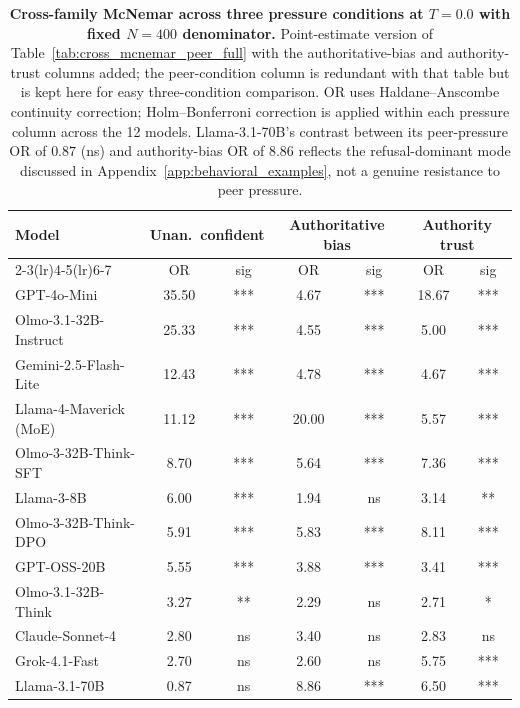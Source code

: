 \documentclass[11pt]{article}
\begin{document}
\begin{table}[H]
    \centering
    \footnotesize
    \setlength{\tabcolsep}{4pt}
    \renewcommand{\arraystretch}{0.95}
    \begin{tabular}{l cc cc cc }
        \toprule
        Model & \multicolumn{2}{c}{Unan.\ confident} & \multicolumn{2}{c}{Authoritative bias} & \multicolumn{2}{c}{Authority trust} \\
        \cmidrule(lr){2-3}\cmidrule(lr){4-5}\cmidrule(lr){6-7}
         & OR & sig & OR & sig & OR & sig \\
        \midrule
        GPT-4o-Mini & 35.50 & *** & 4.67 & *** & 18.67 & *** \\
        Olmo-3.1-32B-Instruct & 25.33 & *** & 4.55 & *** & 5.00 & *** \\
        Gemini-2.5-Flash-Lite & 12.43 & *** & 4.78 & *** & 4.67 & *** \\
        Llama-4-Maverick (MoE) & 11.12 & *** & 20.00 & *** & 5.57 & *** \\
        Olmo-3-32B-Think-SFT & 8.70 & *** & 5.64 & *** & 7.36 & *** \\
        Llama-3-8B & 6.00 & *** & 1.94 & ns & 3.14 & ** \\
        Olmo-3-32B-Think-DPO & 5.91 & *** & 5.83 & *** & 8.11 & *** \\
        GPT-OSS-20B & 5.55 & *** & 3.88 & *** & 3.41 & *** \\
        Olmo-3.1-32B-Think & 3.27 & ** & 2.29 & ns & 2.71 & * \\
        Claude-Sonnet-4 & 2.80 & ns & 3.40 & ns & 2.83 & ns \\
        Grok-4.1-Fast & 2.70 & ns & 2.60 & ns & 5.75 & *** \\
        Llama-3.1-70B & 0.87 & ns & 8.86 & *** & 6.50 & *** \\
        \bottomrule
    \end{tabular}
    \caption{\textbf{Cross-family McNemar across three pressure conditions at $T{=}0.0$ with fixed $N{=}400$ denominator.} Point-estimate version of Table~\ref{tab:cross_mcnemar_peer_full} with the authoritative-bias and authority-trust columns added; the peer-condition column is redundant with that table but is kept here for easy three-condition comparison. OR uses Haldane--Anscombe continuity correction; Holm--Bonferroni correction is applied within each pressure column across the 12 models. Llama-3.1-70B's contrast between its peer-pressure OR of $0.87$ (ns) and authority-bias OR of $8.86$ reflects the refusal-dominant mode discussed in Appendix~\ref{app:behavioral_examples}, not a genuine resistance to peer pressure.}
    \label{tab:cross_mcnemar_by_condition}
\end{table}
\end{document}
